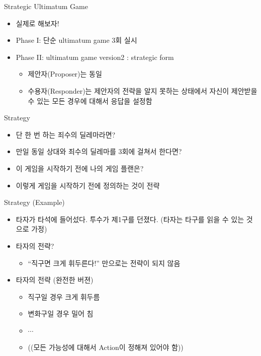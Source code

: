 \documentclass[final]{beamer}
\begin{document}
\begin{frame}[t]{Strategic Ultimatum Game}
	\begin{itemize}
		\item 실제로 해보자!
		\item Phase I: 단순 ultimatum game 3회 실시
		\item Phase II: ultimatum game version2 : strategic form
		\begin{itemize}
			\item 제안자(Proposer)는 동일
			\item 수용자(Responder)는 제안자의 전략을 알지 못하는 상태에서 자신이 제안받을 수 있는 모든 경우에 대해서 응답을 설정함
		\end{itemize}
	\end{itemize}
\end{frame}

\begin{frame}[t]{Strategy}
	\begin{itemize}
		\item 단 한 번 하는 죄수의 딜레마라면?
		\item 만일 동일 상대와 죄수의 딜레마를 3회에 걸쳐서 한다면?
		\item 이 게임을 시작하기 전에 나의 게임 플랜은? 
		\item 이렇게 게임을 시작하기 전에 정의하는 것이 전략
	\end{itemize}
\end{frame}

\begin{frame}[t]{Strategy (Example)}
	\begin{itemize}
		\item 타자가 타석에 들어섰다. 투수가 제1구를 던졌다. (타자는 타구를 읽을 수 있는 것으로 가정)
		\item 타자의 전략?
		\begin{itemize}
			\item ``직구면 크게 휘두른다!'' 만으로는 전략이 되지 않음
		\end{itemize}
		\item 타자의 전략 (완전한 버젼)
		\begin{itemize}
			\item 직구일 경우 크게 휘두름
			\item 변화구일 경우 밀어 침
			\item $\cdots$
			\item ((모든 가능성에 대해서 Action이 정해져 있어야 함))
		\end{itemize}
	\end{itemize}
\end{frame}
\end{document}
